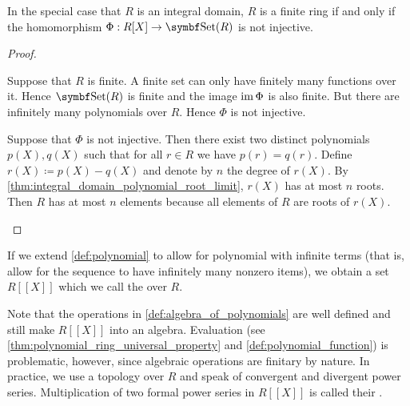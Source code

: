 \begin{proposition}\label{thm:polynomial_embedding_behavior}
  In the special case that \( R \) is an integral domain, \( R \) is a finite ring if and only if the homomorphism \( \Phi: R[X] \to \Cat{Set}(R) \) is not injective.
\end{proposition}
\begin{proof}
  \begin{description}
    \Implies Suppose that \( R \) is finite. A finite set can only have finitely many functions over it. Hence \( \Cat{Set}(R) \) is finite and the image \( \operatorname{im} \Phi \) is also finite. But there are infinitely many polynomials over \( R \). Hence \( \Phi \) is not injective.

    \ImpliedBy Suppose that \( \Phi \) is not injective. Then there exist two distinct polynomials \( p(X), q(X) \) such that for all \( r \in R \) we have \( p(r) = q(r) \). Define \( r(X) \coloneqq p(X) - q(X) \) and denote by \( n \) the degree of \( r(X) \). By \cref{thm:integral_domain_polynomial_root_limit}, \( r(X) \) has at most \( n \) roots. Then \( R \) has at most \( n \) elements because all elements of \( R \) are roots of \( r(X) \).
  \end{description}
\end{proof}

\begin{definition}\label{def:formal_power_series}
  If we extend \cref{def:polynomial} to allow for polynomial with infinite terms (that is, allow for the sequence to have infinitely many nonzero items), we obtain a set \( R[[X]] \) which we call the  over \( R \).

  Note that the operations in \cref{def:algebra_of_polynomials} are well defined and still make \( R[[X]] \) into an algebra. Evaluation (see \cref{thm:polynomial_ring_universal_property} and \cref{def:polynomial_function}) is problematic, however, since algebraic operations are finitary by nature. In practice, we use a topology over \( R \) and speak of convergent and divergent power series. Multiplication of two formal power series in \( R[[X]] \) is called their .
\end{definition}

